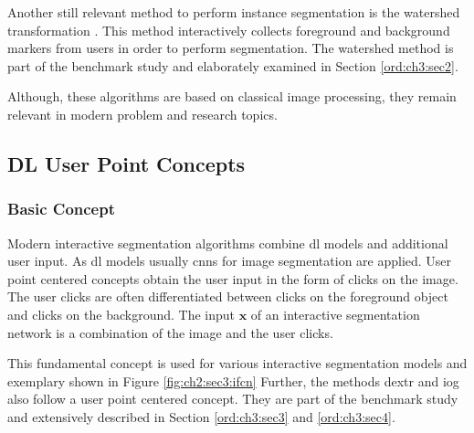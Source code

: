 Another still relevant method to perform instance segmentation is the watershed transformation \cite{VS91-Watershed}.
This method interactively collects foreground and background markers from users in order to perform segmentation.
The watershed method is part of the benchmark study and elaborately examined in Section \ref{ord:ch3:sec2}.

 
Although, these algorithms are based on classical image processing, they remain relevant in modern problem and research topics.


\subsection{DL User Point Concepts}\label{ord:ch2:sec3:subsec2}

\subsubsection{Basic Concept}
Modern interactive segmentation algorithms combine \gls{dl} models and additional user input.
As \gls{dl} models usually \glspl{cnn} for image segmentation are applied.
User point centered concepts obtain the user input in the form of clicks on the image.
The user clicks are often differentiated between clicks on the foreground object and clicks on the background.
The input $\textbf{x}$ of an interactive segmentation network is a combination of the image and the user clicks.

This fundamental concept is used for various interactive segmentation models \cite{Xu16-InteractiveObjectSelection} \cite{MVL18-ITIS} and exemplary shown in Figure \ref{fig:ch2:sec3:ifcn}
Further, the methods \gls{dextr}  \cite{Man18-DEXTR} and \gls{iog} \cite{Zha20-IOG} also follow a user point centered concept. They are part of the benchmark study and extensively described in Section \ref{ord:ch3:sec3} and \ref{ord:ch3:sec4}.

